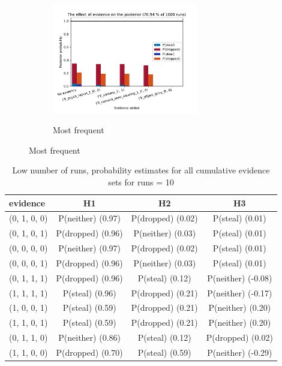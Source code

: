 \documentclass[12pt]{article}
\begin{document}
\begin{figure}[htbp]
\begin{center}
\begin{subfigure}{\textwidth}
{\includegraphics[width=0.7\textwidth]{GroteMarktPrivateEND/plots/freq/evidence_progress_GroteMarktPrivate_1000_70.9400.pdf}}
\caption{Most frequent}
\label{sfb}
\end{subfigure}
\end{center}
\end{figure}



\begin{table}
\begin{center}
\begin{tabular}{|l|c|c|c|}
\hline
evidence & H1 & H2 & H3 \\
\hline
(0, 1, 0, 0)&P(neither) (0.97) & P(dropped) (0.02) & P(steal) (0.01) \\
(0, 1, 0, 1)&P(dropped) (0.96) & P(neither) (0.03) & P(steal) (0.01) \\
(0, 0, 0, 0)&P(neither) (0.97) & P(dropped) (0.02) & P(steal) (0.01) \\
(0, 0, 0, 1)&P(dropped) (0.96) & P(neither) (0.03) & P(steal) (0.01) \\
(0, 1, 1, 1)&P(dropped) (0.96) & P(steal) (0.12) & P(neither) (-0.08) \\
(1, 1, 1, 1)&P(steal) (0.96) & P(dropped) (0.21) & P(neither) (-0.17) \\
(1, 0, 0, 1)&P(steal) (0.59) & P(dropped) (0.21) & P(neither) (0.20) \\
(1, 1, 0, 1)&P(steal) (0.59) & P(dropped) (0.21) & P(neither) (0.20) \\
(0, 1, 1, 0)&P(neither) (0.86) & P(steal) (0.12) & P(dropped) (0.02) \\
(1, 1, 0, 0)&P(dropped) (0.70) & P(steal) (0.59) & P(neither) (-0.29) \\
\hline
\end{tabular}
\end{center}
\caption{ Low number of runs, probability estimates for all cumulative evidence sets for runs =  10}
\label{journal}
\end{table}
\end{document}
